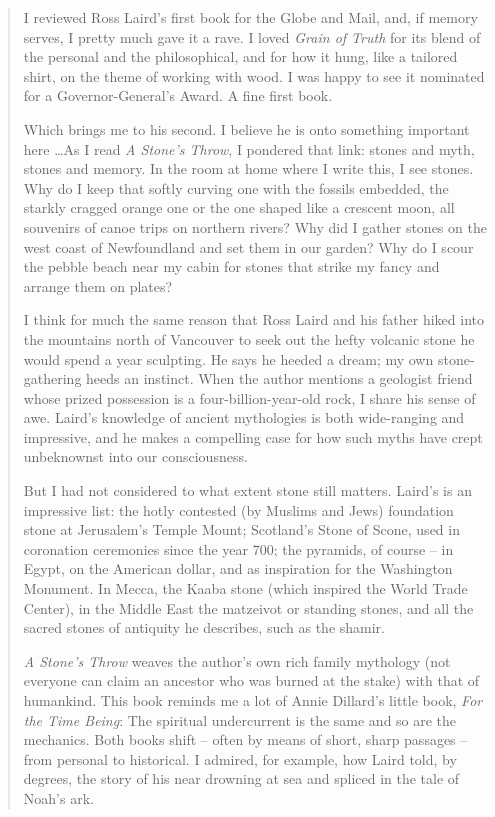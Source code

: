 \documentclass[10pt,DIV09,letterpaper,oneside,headsepline]{scrreprt}
\begin{document}
\begin{quotation}
I reviewed Ross Laird's first book for the Globe and Mail, and, if memory serves, I pretty much gave it a rave. I loved \textit{Grain of Truth} for its blend of the personal and the philosophical, and for how it hung, like a tailored shirt, on the theme of working with wood. I was happy to see it nominated for a Governor-General's Award. A fine first book.

Which brings me to his second. I believe he is onto something important here \ldots As I read \textit{A Stone's Throw}, I pondered that link: stones and myth, stones and memory. In the room at home where I write this, I see stones. Why do I keep that softly curving one with the fossils embedded, the starkly cragged orange one or the one shaped like a crescent moon, all souvenirs of canoe trips on northern rivers? Why did I gather stones on the west coast of Newfoundland and set them in our garden? Why do I scour the pebble beach near my cabin for stones that strike my fancy and arrange them on plates?

I think for much the same reason that Ross Laird and his father hiked into the mountains north of Vancouver to seek out the hefty volcanic stone he would spend a year sculpting. He says he heeded a dream; my own stone-gathering heeds an instinct. When the author mentions a geologist friend whose prized possession is a four-billion-year-old rock, I share his sense of awe. Laird's knowledge of ancient mythologies is both wide-ranging and impressive, and he makes a compelling case for how such myths have crept unbeknownst into our consciousness.

But I had not considered to what extent stone still matters. Laird's is an impressive list: the hotly contested (by Muslims and Jews) foundation stone at Jerusalem's Temple Mount; Scotland's Stone of Scone, used in coronation ceremonies since the year 700; the pyramids, of course -- in Egypt, on the American dollar, and as inspiration for the Washington Monument. In Mecca, the Kaaba stone (which inspired the World Trade Center), in the Middle East the matzeivot or standing stones, and all the sacred stones of antiquity he describes, such as the shamir.

\textit{A Stone's Throw} weaves the author's own rich family mythology (not everyone can claim an ancestor who was burned at the stake) with that of humankind. This book reminds me a lot of Annie Dillard's little book, \textit{For the Time Being}: The spiritual undercurrent is the same and so are the mechanics. Both books shift -- often by means of short, sharp passages -- from personal to historical. I admired, for example, how Laird told, by degrees, the story of his near drowning at sea and spliced in the tale of Noah's ark.


\end{quotation}
\end{document}
